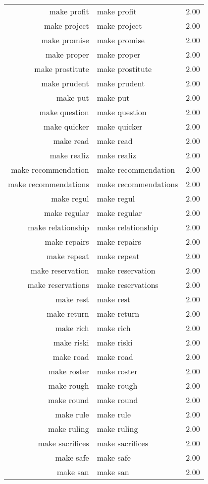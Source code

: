 \begin{table}[ht]
\begin{tabular}{rlr}
  make profit & make profit & 2.00 \\ 
  make project & make project & 2.00 \\ 
  make promise & make promise & 2.00 \\ 
  make proper & make proper & 2.00 \\ 
  make prostitute & make prostitute & 2.00 \\ 
  make prudent & make prudent & 2.00 \\ 
  make put & make put & 2.00 \\ 
  make question & make question & 2.00 \\ 
  make quicker & make quicker & 2.00 \\ 
  make read & make read & 2.00 \\ 
  make realiz & make realiz & 2.00 \\ 
  make recommendation & make recommendation & 2.00 \\ 
  make recommendations & make recommendations & 2.00 \\ 
  make regul & make regul & 2.00 \\ 
  make regular & make regular & 2.00 \\ 
  make relationship & make relationship & 2.00 \\ 
  make repairs & make repairs & 2.00 \\ 
  make repeat & make repeat & 2.00 \\ 
  make reservation & make reservation & 2.00 \\ 
  make reservations & make reservations & 2.00 \\ 
  make rest & make rest & 2.00 \\ 
  make return & make return & 2.00 \\ 
  make rich & make rich & 2.00 \\ 
  make riski & make riski & 2.00 \\ 
  make road & make road & 2.00 \\ 
  make roster & make roster & 2.00 \\ 
  make rough & make rough & 2.00 \\ 
  make round & make round & 2.00 \\ 
  make rule & make rule & 2.00 \\ 
  make ruling & make ruling & 2.00 \\ 
  make sacrifices & make sacrifices & 2.00 \\ 
  make safe & make safe & 2.00 \\ 
  make san & make san & 2.00 \\ 

\end{tabular}
\end{table}
